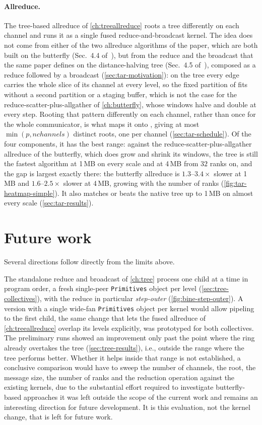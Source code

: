 \paragraph{Allreduce.}
The tree-based allreduce of \cref{ch:treeallreduce} roots a \bine{} tree differently on each channel and runs it as a single fused reduce-and-broadcast kernel.
The idea does not come from either of the two allreduce algorithms of the \bine{} paper, which are both built on the butterfly (Sec.~4.4 of~\cite{desensi2025bine}), but from the reduce and the broadcast that the same paper defines on the distance-halving \bine{} tree (Sec.~4.5 of~\cite{desensi2025bine}), composed as a reduce followed by a broadcast (\cref{sec:tar-motivation}): on the tree every edge carries the whole slice of its channel at every level, so the fixed partition of \nccl{} fits without a second partition or a staging buffer, which is not the case for the reduce-scatter-plus-allgather of \cref{ch:butterfly}, whose windows halve and double at every step.
Rooting that pattern differently on each channel, rather than once for the whole communicator, is what maps it onto \nccl{}, giving at most $\min(p,\mathit{nchannels})$ distinct roots, one per channel (\cref{sec:tar-schedule}).
Of the four components, it has the best range: against the reduce-scatter-plus-allgather allreduce of the \bine{} butterfly, which does grow and shrink its windows, the tree is still the fastest algorithm at 1\,MB on every scale and at 4\,MB from $32$ ranks on, and the gap is largest exactly there: the butterfly allreduce is $1.3$--$3.4\times$ slower at 1\,MB and $1.6$--$2.5\times$ slower at 4\,MB, growing with the number of ranks (\cref{fig:tar-heatmap-simple}).
It also matches or beats the native \nccl{} tree up to 1\,MB on almost every scale (\cref{sec:tar-results}).

\section{Future work}
Several directions follow directly from the limits above.

The standalone reduce and broadcast of \cref{ch:tree} process one child at a time in program order, a fresh single-peer \texttt{Primitives} object per level (\cref{sec:tree-collectives}), with the reduce in particular \emph{step-outer} (\cref{fig:bine-step-outer}).
A version with a single wide-fan \texttt{Primitives} object per kernel would allow pipeling to the first child, the same change that lets the fused allreduce of \cref{ch:treeallreduce} overlap its levels explicitly, was prototyped for both collectives. The preliminary runs showed an improvement only past the point where the ring already overtakes the tree (\cref{sec:tree-results}), i.e., outside the range where the tree performs better.
Whether it helps inside that range is not established, a conclusive comparison would have to sweep the number of channels, the root, the message size, the number of ranks and the reduction operation against the existing kernels, due to the substantial effort required to investigate butterfly-based approaches it was left outside the scope of the current work and remains an interesting direction for future development.
It is this evaluation, not the kernel change, that is left for future work.

